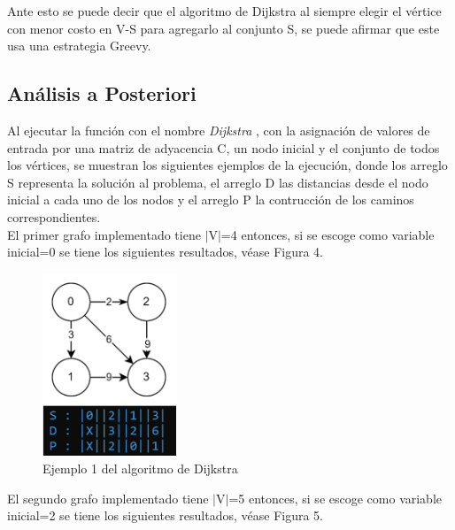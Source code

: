 \documentclass[12pt,twoside]{article}
\begin{document}
    Ante esto se puede decir que el algoritmo de Dijkstra al siempre elegir el v\'ertice con menor costo en V-S para agregarlo al conjunto S, se puede afirmar que este usa una estrategia Greevy.
    
    \subsection{An\'alisis a Posteriori}
    Al ejecutar la funci\'on con el nombre {\it Dijkstra }, con la asignaci\'on de valores de entrada por una matriz de adyacencia C, un nodo inicial y el conjunto de todos los v\'ertices, se muestran los siguientes ejemplos de la ejecuci\'on, donde los arreglo S representa la soluci\'on al problema, el arreglo D las distancias desde el nodo inicial a cada uno de los nodos y el arreglo P la contrucci\'on de los caminos correspondientes.\\
    El primer grafo implementado tiene $|$V$|$=4 entonces, si se escoge como variable inicial=0 se tiene los siguientes resultados, v\'ease Figura 4.
    \begin{figure}[H]
        \centering
        \includegraphics[width=4cm]{imagenes/Imagen1.png}
        \caption{Ejemplo 1 del algoritmo de Dijkstra}
    \end{figure}
    El segundo grafo implementado tiene $|$V$|$=5 entonces, si se escoge como variable inicial=2 se tiene los siguientes resultados, v\'ease Figura 5.
\end{document}
